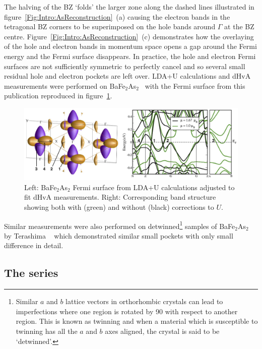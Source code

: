 The halving of the \ac{BZ} `folds' the larger zone along the dashed lines illustrated in figure~\ref{Fig:Intro:AsReconstruction}~(a) causing the electron bands in the tetragonal \ac{BZ} corners to be superimposed on the hole bands around $\Gamma$ at the \ac{BZ} centre. Figure~\ref{Fig:Intro:AsReconstruction}~(c) demonstrates how the overlaying of the hole and electron bands in momentum space opens a gap around the Fermi energy and the Fermi surface disappears. In practice, the hole and electron Fermi surfaces are not sufficiently symmetric to perfectly cancel and so several small residual hole and electron pockets are left over. \acs{LDA}+U calculations and \ac{dHvA} measurements were performed on BaFe$_2$As$_2$~\cite{Analytis2010b} with the Fermi surface from this publication reproduced in figure~\ref{Fig:Intro:FSBaFeAs}.
\begin{figure}[htbp]
    \begin{center}
        \includegraphics[scale=0.7]{Chapter-Introduction/Figures/FSBaFeAs/FSBaFeAs}
        \caption{Left: BaFe$_2$As$_2$ Fermi surface from \acs{LDA}+U calculations adjusted to fit \ac{dHvA} measurements. Right: Corresponding band structure showing both with (green) and without (black) corrections to $U$.}
        \label{Fig:Intro:FSBaFeAs}
    \end{center}
\end{figure}
Similar measurements were also performed on detwinned\footnote{Similar $a$ and $b$ lattice vectors in orthorhombic crystals can lead to imperfections where one region is rotated by \unit{90}{\degree} with respect to another region. This is known as twinning and when a material which is susceptible to twinning has all the $a$ and $b$ axes aligned, the crystal is said to be `detwinned'.} samples of BaFe$_2$As$_2$ by Terashima \etal~\cite{Terashima2011} which demonstrated similar small pockets with only small difference in detail.


\subsection{The \BaFeAsP{} series}


